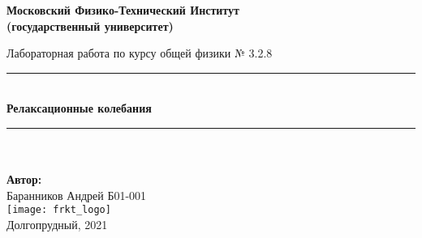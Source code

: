 \newcommand{\HRule}{\rule{\linewidth}{0.7mm}} %
	
	\begin{center}
		\large\textbf{Московский Физико-Технический Институт}\\
		\large\textbf{(государственный университет)}
	
		\vfill
		
		\Large Лабораторная работа по курсу общей физики № 3.2.8\\[0.5cm] %
		
		
		\HRule
		\\[0.4cm]
		{ \huge \bfseries Релаксационные колебания}
		\\[0.4cm] %
		\HRule
		\\[0.5cm]
		
		\ \\
	\textbf{\large Автор:} \\	
	\large Баранников Андрей Б01-001\\
		\vfill
		\hspace*{-0.8 cm}\texttt{[image: frkt\_logo]}\\
		\large Долгопрудный, 2021
	\end{center}

\newpage
\setcounter{page}{2}
\fancyfoot[c]{\thepage}
\fancyhead[R]{}